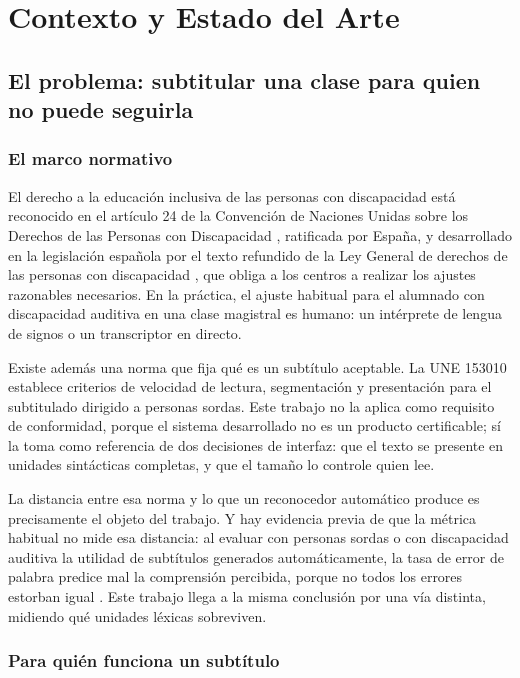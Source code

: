 \chapter{Contexto y Estado del Arte}
\label{cap:estado}

\section{El problema: subtitular una clase para quien no puede seguirla}

\subsection{El marco normativo}

El derecho a la educación inclusiva de las personas con discapacidad está reconocido en el
artículo 24 de la Convención de Naciones Unidas sobre los Derechos de las Personas con
Discapacidad \cite{onu2006cdpd}, ratificada por España, y desarrollado en la legislación
española por el texto refundido de la Ley General de derechos de las personas con
discapacidad \cite{espana2013tr}, que obliga a los centros a realizar los ajustes
razonables necesarios. En la práctica, el ajuste habitual para el alumnado con discapacidad
auditiva en una clase magistral es humano: un intérprete de lengua de signos o un
transcriptor en directo.

Existe además una norma que fija qué es un subtítulo aceptable. La UNE
153010 \cite{aenor2012une153010} establece criterios de velocidad de lectura, segmentación y
presentación para el subtitulado dirigido a personas sordas. Este trabajo no la aplica como
requisito de conformidad, porque el sistema desarrollado no es un producto certificable; sí
la toma como referencia de dos decisiones de interfaz: que el texto se presente en unidades
sintácticas completas, y que el tamaño lo controle quien lee.

La distancia entre esa norma y lo que un reconocedor automático produce es precisamente el
objeto del trabajo. Y hay evidencia previa de que la métrica habitual no mide esa distancia:
al evaluar con personas sordas o con discapacidad auditiva la utilidad de subtítulos
generados automáticamente, la tasa de error de palabra predice mal la comprensión percibida,
porque no todos los errores estorban igual \cite{kafle2017captions}. Este trabajo llega a la
misma conclusión por una vía distinta, midiendo qué unidades léxicas sobreviven.

\subsection{Para quién funciona un subtítulo}
\label{sec:para-quien}

